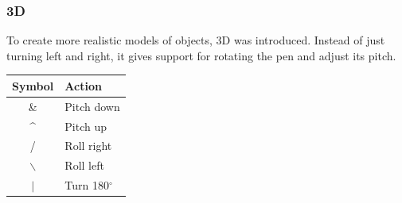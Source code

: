 \documentclass[11pt,a4paper]{article}
\newcommand{\degree}{\ensuremath{^\circ}}
\begin{document}
\subsubsection{3D}
To create more realistic models of objects, 3D was introduced. Instead of just turning left and right, it gives support for rotating the pen and adjust its pitch.

\begin{center}
\begin{tabular}{c | l}
Symbol & Action \\ \hline
\& & Pitch down \\
\^{} & Pitch up \\
/ & Roll right \\
$\backslash$ & Roll left \\
$\vert$  & Turn 180\degree \\
\end{tabular}
\end{center}
\end{document}
